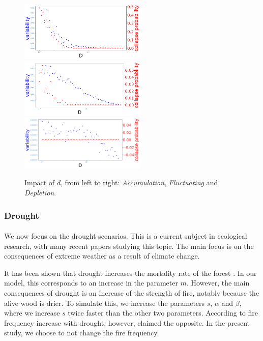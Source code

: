 \documentclass{article}
\begin{document}
\begin{figure}[h]
\begin{center}
\includegraphics[width=6cm]{results/return_to_equilibrium_1.png}
\includegraphics[width=6cm]{results/equivalent_1.png}
\includegraphics[width=6cm]{results/fuel_low_1.png}
\end{center}
\caption{\label{fig:temp}Impact of $d$, from left to right: \textit{Accumulation}, \textit{Fluctuating} and \textit{Depletion}. \label{fig:changed}}
\end{figure}


\newpage
\subsubsection{Drought}
\label{drought}



\paragraph{}
We now focus on the drought scenarios. This is a current subject in ecological research, with many recent papers studying this topic. The main focus is on the consequences of extreme weather as a result of climate change. 

It has been shown that drought increases the mortality rate of the forest \citep{bradstock_biogeographic_2010}. In our model, this corresponds to an increase in the parameter $m$. However, the main consequences of drought is an increase of the strength of fire, notably because the alive wood is drier. To simulate this, we increase  the parameters $s$, $\alpha$ and $\beta$, where we increase $s$ twice faster than the other two parameters. According to \cite{fernandes_fire-smart_2013, fairman_too_2016} fire frequency increase with drought, however, \cite{bergeron_predicting_nodate} claimed the opposite. In the present study, we choose to not change the fire frequency.
\end{document}
